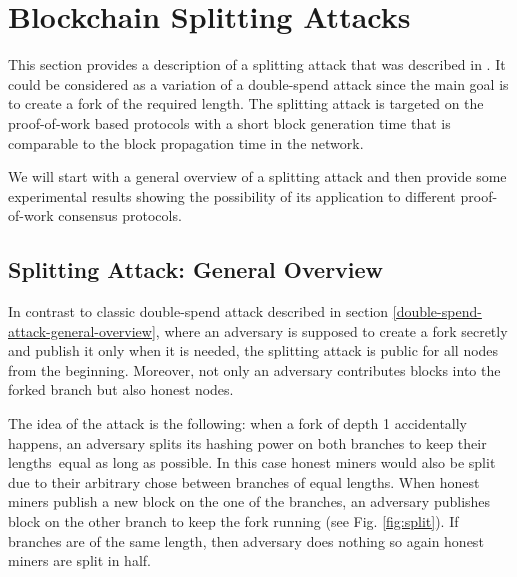 \documentclass[10pt,a4paper]{article}
\numberwithin{equation}{section} %
\theoremstyle{plain}
\theoremstyle{definition}
\theoremstyle{remark}
\begin{document}
	\section{Blockchain Splitting Attacks}
	
	This section provides a description of a splitting attack that was described in \cite{KP15}. It could be considered as a variation of a double-spend attack since the main goal is to create a fork of the required length. The splitting attack is targeted on the proof-of-work based protocols with a short block generation time that is comparable to the block propagation time in the network.
	
	We will start with a general overview of a splitting attack and then provide some experimental results showing the possibility of its application to different proof-of-work consensus protocols.  
	
	\subsection{Splitting Attack: General Overview}
	
	In contrast to classic double-spend attack described in section \ref{double-spend-attack-general-overview}, where an adversary is supposed to create a fork secretly and publish it only when it is needed, the splitting attack is public for all nodes from the beginning. Moreover, not only an adversary contributes blocks into the forked branch but also honest nodes.
	
	The idea of the attack is the following: when a fork of depth 1 accidentally happens, an adversary splits its hashing power on both branches to keep their lengths\footnotemark \ equal as long as possible. In this case honest miners would also be split due to their arbitrary chose between branches of equal lengths. When honest miners publish a new block on the one of the branches, an adversary publishes block on the other branch to keep the fork running (see Fig. \ref{fig:split}). If branches are of the same length, then adversary does nothing so again honest miners are split in half.
	
	
\end{document}
